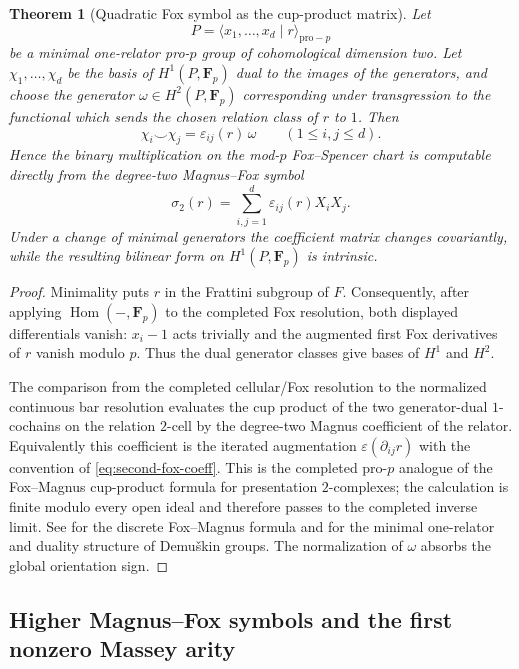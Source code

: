 \documentclass[11pt]{article}
\newtheorem{theorem}{Theorem}[section]
\theoremstyle{definition}
\begin{document}
\begin{theorem}[Quadratic Fox symbol as the cup-product matrix]\label{thm:quadratic-fox-cup}
Let
\[
P=\langle x_1,\ldots,x_d\mid r\rangle_{\mathrm{pro}-p}
\]
be a minimal one-relator pro-$p$ group of cohomological dimension two.  Let $\chi_1,\ldots,\chi_d$ be the basis of $H^1(P,\mathbf F_p)$ dual to the images of the generators, and choose the generator $\omega\in H^2(P,\mathbf F_p)$ corresponding under transgression to the functional which sends the chosen relation class of $r$ to $1$.  Then
\begin{equation}\label{eq:fox-cup-matrix}
\chi_i\smile\chi_j
=
\varepsilon_{ij}(r)\,\omega
\qquad(1\le i,j\le d).
\end{equation}
Hence the binary multiplication on the mod-$p$ Fox--Spencer chart is computable directly from the degree-two Magnus--Fox symbol
\[
\sigma_2(r)
=
\sum_{i,j=1}^{d}\varepsilon_{ij}(r)X_iX_j.
\]
Under a change of minimal generators the coefficient matrix changes covariantly, while the resulting bilinear form on $H^1(P,\mathbf F_p)$ is intrinsic.
\end{theorem}

\begin{proof}
Minimality puts $r$ in the Frattini subgroup of $F$.  Consequently, after applying $\operatorname{Hom}(-,\mathbf F_p)$ to the completed Fox resolution, both displayed differentials vanish: $x_i-1$ acts trivially and the augmented first Fox derivatives of $r$ vanish modulo $p$.  Thus the dual generator classes give bases of $H^1$ and $H^2$.

The comparison from the completed cellular/Fox resolution to the normalized continuous bar resolution evaluates the cup product of the two generator-dual $1$-cochains on the relation $2$-cell by the degree-two Magnus coefficient of the relator.  Equivalently this coefficient is the iterated augmentation $\varepsilon(\partial_{ij}r)$ with the convention of \eqref{eq:second-fox-coeff}.  This is the completed pro-$p$ analogue of the Fox--Magnus cup-product formula for presentation $2$-complexes; the calculation is finite modulo every open ideal and therefore passes to the completed inverse limit.  See \cite{SuciuWangCup} for the discrete Fox--Magnus formula and \cite{LabuteClassification,NSW} for the minimal one-relator and duality structure of Demu\v{s}kin groups.  The normalization of $\omega$ absorbs the global orientation sign.
\end{proof}


\subsection{Higher Magnus--Fox symbols and the first nonzero Massey arity}
\end{document}
